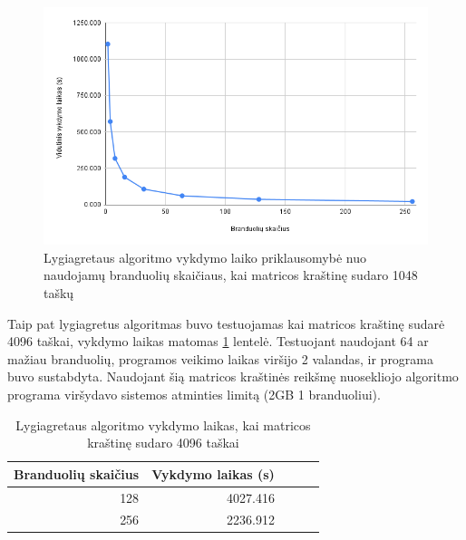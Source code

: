 \documentclass{VUMIFPSbakalaurinis}
\begin{document}
\begin{figure}[H]
    \centering
    \includegraphics[scale=0.5]{img/parallel_time.png}
    \caption{Lygiagretaus algoritmo vykdymo laiko priklausomybė nuo naudojamų branduolių skaičiaus, kai matricos kraštinę sudaro 1048 taškų}
    \label{img:parallel_time}
\end{figure}


Taip pat lygiagretus algoritmas buvo testuojamas kai matricos kraštinę sudarė 4096 taškai, vykdymo laikas matomas \ref{table:parallel4096} lentelė.
Testuojant naudojant 64 ar mažiau branduolių, programos veikimo laikas viršijo 2 valandas, ir programa buvo sustabdyta. 
Naudojant šią matricos kraštinės reikšmę nuosekliojo algoritmo programa viršydavo sistemos atminties limitą (2GB 1 branduoliui).


\begin{table}[]
    \begin{tabular}{|l|lrrr|}
        \hline
        \multicolumn{1}{|r|}{Branduolių skaičius} & \multicolumn{1}{l|}{Vykdymo laikas (s)} \\ \hline
        \multicolumn{1}{|r|}{128}                 & \multicolumn{1}{r|}{4027.416}           \\ \hline
        \multicolumn{1}{|r|}{256}                 & \multicolumn{1}{r|}{2236.912}           \\ \hline
        
    \end{tabular}
    \caption{Lygiagretaus algoritmo vykdymo laikas, kai matricos kraštinę sudaro 4096 taškai}
    \label{table:parallel4096}
\end{table}
\end{document}
